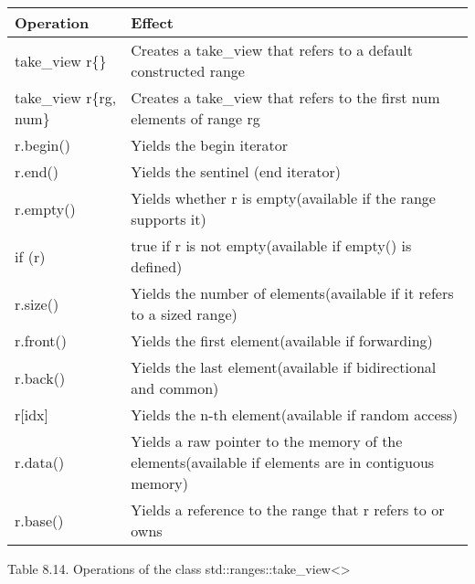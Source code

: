\begin{longtable}[c]{|l|l|}
\hline
\textbf{Operation} & \textbf{Effect}                                                        \\ \hline
\endfirsthead
%
\endhead
%
take\_view r\{\}   & Creates a take\_view that refers to a default constructed range        \\ \hline
take\_view r\{rg, num\} & Creates a take\_view that refers to the first num elements of range rg                             \\ \hline
r.begin()          & Yields the begin iterator                                              \\ \hline
r.end()            & Yields the sentinel (end iterator)                                     \\ \hline
r.empty()          & Yields whether r is empty(available if the range supports it)          \\ \hline
if (r)             & true if r is not empty(available if empty() is defined)                \\ \hline
r.size()           & Yields the number of elements(available if it refers to a sized range) \\ \hline
r.front()          & Yields the first element(available if forwarding)                      \\ \hline
r.back()           & Yields the last element(available if bidirectional and common)         \\ \hline
r{[}idx{]}         & Yields the n-th element(available if random access)                    \\ \hline
r.data()                & Yields a raw pointer to the memory of the elements(available if elements are in contiguous memory) \\ \hline
r.base()           & Yields a reference to the range that r refers to or owns               \\ \hline
\end{longtable}

\begin{center}
Table 8.14. Operations of the class std::ranges::take\_view<>
\end{center}


